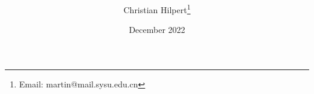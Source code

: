 

\title{\sffamily\bfseries%
	\papertitle%
}

\author[a]{Christian Hilpert\thanks{Email: martin@mail.sysu.edu.cn}}


\date{%
	December 2022}

\maketitle


%
